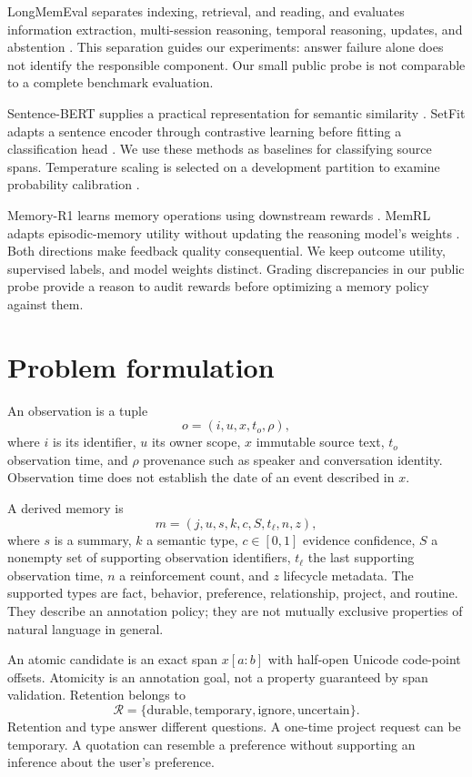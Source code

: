 \documentclass[11pt]{article}
\begin{document}
LongMemEval separates indexing, retrieval, and reading, and evaluates information extraction, multi-session reasoning, temporal reasoning, updates, and abstention \citep{longmem}. This separation guides our experiments: answer failure alone does not identify the responsible component. Our small public probe is not comparable to a complete benchmark evaluation.

Sentence-BERT supplies a practical representation for semantic similarity \citep{sbert}. SetFit adapts a sentence encoder through contrastive learning before fitting a classification head \citep{setfit}. We use these methods as baselines for classifying source spans. Temperature scaling is selected on a development partition to examine probability calibration \citep{calibration}.

Memory-R1 learns memory operations using downstream rewards \citep{memoryr1}. MemRL adapts episodic-memory utility without updating the reasoning model's weights \citep{memrl}. Both directions make feedback quality consequential. We keep outcome utility, supervised labels, and model weights distinct. Grading discrepancies in our public probe provide a reason to audit rewards before optimizing a memory policy against them.

\section{Problem formulation}
An observation is a tuple
\[
 o=(i,u,x,t_o,\rho),
\]
where $i$ is its identifier, $u$ its owner scope, $x$ immutable source text, $t_o$ observation time, and $\rho$ provenance such as speaker and conversation identity. Observation time does not establish the date of an event described in $x$.

A derived memory is
\[
 m=(j,u,s,k,c,S,t_\ell,n,z),
\]
where $s$ is a summary, $k$ a semantic type, $c\in[0,1]$ evidence confidence, $S$ a nonempty set of supporting observation identifiers, $t_\ell$ the last supporting observation time, $n$ a reinforcement count, and $z$ lifecycle metadata. The supported types are fact, behavior, preference, relationship, project, and routine. They describe an annotation policy; they are not mutually exclusive properties of natural language in general.

An atomic candidate is an exact span $x[a:b]$ with half-open Unicode code-point offsets. Atomicity is an annotation goal, not a property guaranteed by span validation. Retention belongs to
\[
 \mathcal{R}=\{\text{durable},\text{temporary},\text{ignore},\text{uncertain}\}.
\]
Retention and type answer different questions. A one-time project request can be temporary. A quotation can resemble a preference without supporting an inference about the user's preference.
\end{document}
